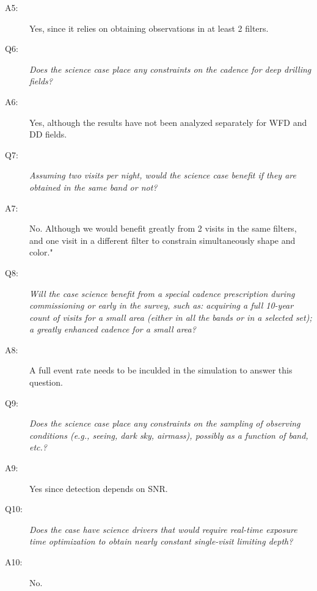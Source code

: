 \begin{description}
 \item[A5:] Yes, since it relies on obtaining observations in at least 2 filters.

 \item[Q6:] {\it Does the science case place any constraints on the
 cadence for deep drilling fields?}

 \item[A6:] Yes, although the results have not been analyzed separately for WFD and DD fields.

 \item[Q7:] {\it Assuming two visits per night, would the science case
 benefit if they are obtained in the same band or not?}

 \item[A7:] No. Although  we would benefit greatly from 2 visits in the same filters, and one visit in a different filter to constrain simultaneously shape and color."

 \item[Q8:] {\it Will the case science benefit from a special cadence
 prescription during commissioning or early in the survey, such as:
 acquiring a full 10-year count of visits for a small area (either in all
 the bands or in a  selected set); a greatly enhanced cadence for a small
 area?}

 \item[A8:] A full event rate needs to be inculded in the simulation to answer this question.

 \item[Q9:] {\it Does the science case place any constraints on the
 sampling of observing conditions (e.g., seeing, dark sky, airmass),
 possibly as a function of band, etc.?}

 \item[A9:] Yes since detection depends on SNR.

 \item[Q10:] {\it Does the case have science drivers that would require
 real-time exposure time optimization to obtain nearly constant
 single-visit limiting depth?}

 \item[A10:] No.

 \end{description}
